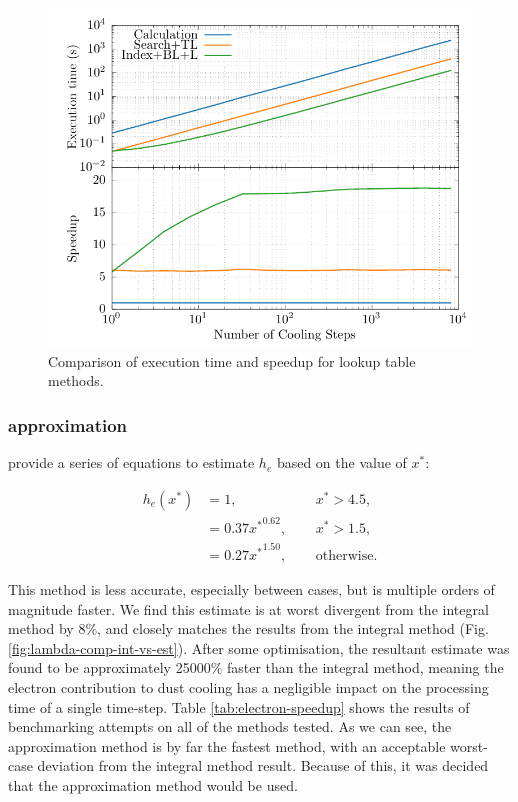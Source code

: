 \begin{figure}[ht]
  \centering
  \includegraphics{assets/lambda-dust-speedup/lambda-dust-speedup.pdf}
  \caption[Dust lookup table methods comparison]{Comparison of execution time and speedup for lookup table methods.}
  \label{fig:dust-opt-speedup}
\end{figure}

\subsubsection{\textcite{dwek_infrared_1981} approximation}

\textcite{dwek_infrared_1981} provide a series of equations to estimate $h_{e}$ based on the value of $x^*$:

\begin{equation}
  \begin{alignedat}{3}
    h_e(x^*) & = 1 ,                && ~~ x^* > 4.5, \\
    & = 0.37{x^*}^{0.62} , && ~~ x^* > 1.5 , \\
    & = 0.27{x^*}^{1.50} , && ~~ \text{otherwise.}
  \end{alignedat} \label{eq:electrontransparencyestimate}
\end{equation}

\noindent
This method is less accurate, especially between cases, but is multiple orders of magnitude faster.
We find this estimate is at worst divergent from the integral method by $8\%$, and closely matches the results from the integral method (Fig. \ref{fig:lambda-comp-int-vs-est}).
After some optimisation, the resultant estimate was found to be approximately \num{25000}\% faster than the integral method, meaning the electron contribution to dust cooling has a negligible impact on the processing time of a single time-step.
Table \ref{tab:electron-speedup} shows the results of benchmarking attempts on all of the methods tested.
As we can see, the approximation method is by far the fastest method, with an acceptable worst-case deviation from the integral method result.
Because of this, it was decided that the approximation method would be used.

